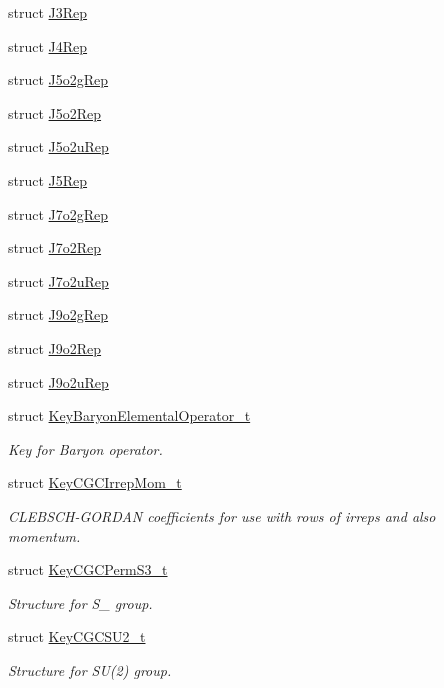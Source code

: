 \begin{DoxyCompactItemize}
\item 
struct \mbox{\hyperlink{structHadron_1_1J3Rep}{J3\+Rep}}
\item 
struct \mbox{\hyperlink{structHadron_1_1J4Rep}{J4\+Rep}}
\item 
struct \mbox{\hyperlink{structHadron_1_1J5o2gRep}{J5o2g\+Rep}}
\item 
struct \mbox{\hyperlink{structHadron_1_1J5o2Rep}{J5o2\+Rep}}
\item 
struct \mbox{\hyperlink{structHadron_1_1J5o2uRep}{J5o2u\+Rep}}
\item 
struct \mbox{\hyperlink{structHadron_1_1J5Rep}{J5\+Rep}}
\item 
struct \mbox{\hyperlink{structHadron_1_1J7o2gRep}{J7o2g\+Rep}}
\item 
struct \mbox{\hyperlink{structHadron_1_1J7o2Rep}{J7o2\+Rep}}
\item 
struct \mbox{\hyperlink{structHadron_1_1J7o2uRep}{J7o2u\+Rep}}
\item 
struct \mbox{\hyperlink{structHadron_1_1J9o2gRep}{J9o2g\+Rep}}
\item 
struct \mbox{\hyperlink{structHadron_1_1J9o2Rep}{J9o2\+Rep}}
\item 
struct \mbox{\hyperlink{structHadron_1_1J9o2uRep}{J9o2u\+Rep}}
\item 
struct \mbox{\hyperlink{structHadron_1_1KeyBaryonElementalOperator__t}{Key\+Baryon\+Elemental\+Operator\+\_\+t}}
\begin{DoxyCompactList}\small\item\em Key for Baryon operator. \end{DoxyCompactList}\item 
struct \mbox{\hyperlink{structHadron_1_1KeyCGCIrrepMom__t}{Key\+C\+G\+C\+Irrep\+Mom\+\_\+t}}
\begin{DoxyCompactList}\small\item\em C\+L\+E\+B\+S\+C\+H-\/\+G\+O\+R\+D\+AN coefficients for use with rows of irreps and also momentum. \end{DoxyCompactList}\item 
struct \mbox{\hyperlink{structHadron_1_1KeyCGCPermS3__t}{Key\+C\+G\+C\+Perm\+S3\+\_\+t}}
\begin{DoxyCompactList}\small\item\em Structure for S\+\_ group. \end{DoxyCompactList}\item 
struct \mbox{\hyperlink{structHadron_1_1KeyCGCSU2__t}{Key\+C\+G\+C\+S\+U2\+\_\+t}}
\begin{DoxyCompactList}\small\item\em Structure for S\+U(2) group. \end{DoxyCompactList}\item 

\end{DoxyCompactItemize}
